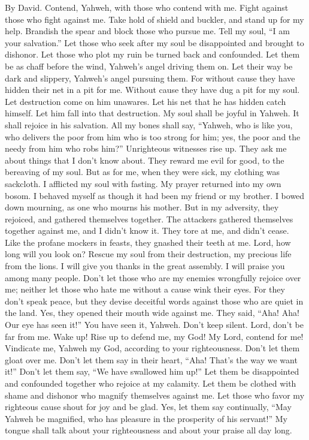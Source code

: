 By David.  Contend, Yahweh, with those who contend with me.
Fight against those who fight against me.  Take hold of
shield and buckler, and stand up for my help.  Brandish the
spear and block those who pursue me. Tell my soul, ``I am your
salvation.''  Let those who seek after my soul be
disappointed and brought to dishonor. Let those who plot my ruin be
turned back and confounded.  Let them be as chaff before the
wind, Yahweh's angel driving them on.  Let their way be dark
and slippery, Yahweh's angel pursuing them.  For without
cause they have hidden their net in a pit for me. Without cause they
have dug a pit for my soul.  Let destruction come on him
unawares. Let his net that he has hidden catch himself. Let him fall
into that destruction.  My soul shall be joyful in Yahweh.
It shall rejoice in his salvation.  All my bones shall say,
``Yahweh, who is like you, who delivers the poor from him who is too
strong for him; yes, the poor and the needy from him who robs him?''
 Unrighteous witnesses rise up. They ask me about things
that I don't know about.  They reward me evil for good, to
the bereaving of my soul.  But as for me, when they were
sick, my clothing was sackcloth. I afflicted my soul with fasting. My
prayer returned into my own bosom.  I behaved myself as
though it had been my friend or my brother. I bowed down mourning, as
one who mourns his mother.  But in my adversity, they
rejoiced, and gathered themselves together. The attackers gathered
themselves together against me, and I didn't know it. They tore at me,
and didn't cease.  Like the profane mockers in feasts, they
gnashed their teeth at me.  Lord, how long will you look
on? Rescue my soul from their destruction, my precious life from the
lions.  I will give you thanks in the great assembly. I
will praise you among many people.  Don't let those who are
my enemies wrongfully rejoice over me; neither let those who hate me
without a cause wink their eyes.  For they don't speak
peace, but they devise deceitful words against those who are quiet in
the land.  Yes, they opened their mouth wide against me.
They said, ``Aha! Aha! Our eye has seen it!''  You have
seen it, Yahweh. Don't keep silent. Lord, don't be far from me.
 Wake up! Rise up to defend me, my God! My Lord, contend
for me!  Vindicate me, Yahweh my God, according to your
righteousness. Don't let them gloat over me.  Don't let
them say in their heart, ``Aha! That's the way we want it!'' Don't let
them say, ``We have swallowed him up!''  Let them be
disappointed and confounded together who rejoice at my calamity. Let
them be clothed with shame and dishonor who magnify themselves against
me.  Let those who favor my righteous cause shout for joy
and be glad. Yes, let them say continually, ``May Yahweh be magnified,
who has pleasure in the prosperity of his servant!''  My
tongue shall talk about your righteousness and about your praise all day
long.

